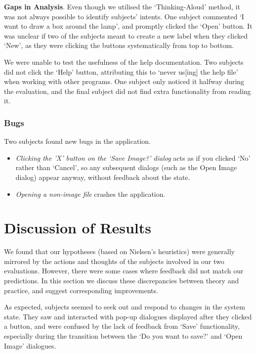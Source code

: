 \documentclass[11pt,twocolumn]{article}
\begin{document}
{\bf Gaps in Analysis}. Even though we utilised the `Thinking-Aloud' method, it was not always possible to identify subjects’ intents. One subject commented `I want to draw a box around the lamp', and promptly clicked the `Open' button. It was unclear if two
of the subjects meant to create a new label when they clicked `New', as they were clicking the buttons systematically from top to bottom.

We were unable to test the usefulness of the help documentation. Two subjects did not click the `Help' button, attributing this to `never us[ing] the help file' when working with other programs. One subject only noticed it halfway during the evaluation, and the final subject did not find extra functionality from reading it.

\subsubsection{Bugs}

Two subjects found new bugs in the application. 
\begin{itemize}
\item \emph{Clicking the 'X' button on the `Save Image?' dialog} acts as if you clicked `No' rather than `Cancel', so any subsequent dialogs (such as the Open Image dialog) appear
anyway, without feedback about the state. 
\item \emph{ Opening a non-image file }crashes the application.
\end{itemize}

\section{Discussion of Results}

We found that our hypotheses (based on Nielsen's heuristics) were generally
mirrored by the actions and thoughts of the subjects involved in our two
evaluations. However, there were some cases where feedback did not match our
predictions. In this section we discuss these discrepancies between theory and
practice, and suggest corresponding improvements.

As expected, subjects seemed to seek out and respond to changes in the system
state. They saw and interacted with pop-up dialogues displayed after they
clicked a button, and were confused by the lack of feedback from `Save'
functionality, especially during the transition between the `Do you want to
save?' and `Open Image' dialogues. 
\end{document}
